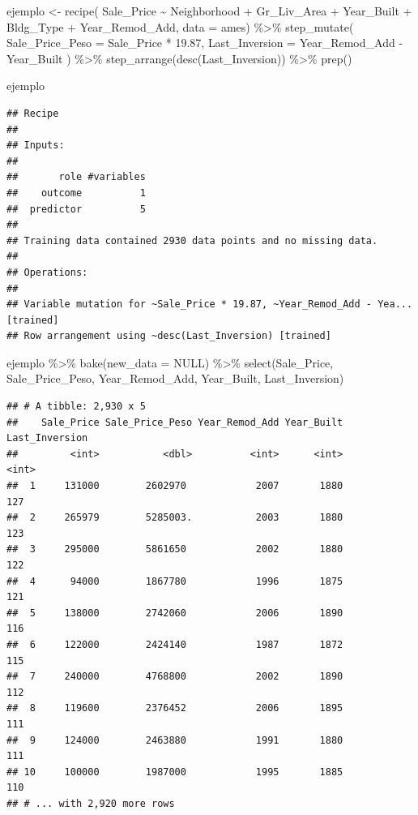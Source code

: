 \documentclass[
]{book}
\newenvironment{Shaded}{\begin{snugshade}}{\end{snugshade}}
\newcommand{\AttributeTok}[1]{\textcolor[rgb]{0.77,0.63,0.00}{#1}}
\newcommand{\ConstantTok}[1]{\textcolor[rgb]{0.00,0.00,0.00}{#1}}
\newcommand{\FloatTok}[1]{\textcolor[rgb]{0.00,0.00,0.81}{#1}}
\newcommand{\FunctionTok}[1]{\textcolor[rgb]{0.00,0.00,0.00}{#1}}
\newcommand{\NormalTok}[1]{#1}
\newcommand{\OtherTok}[1]{\textcolor[rgb]{0.56,0.35,0.01}{#1}}
\newcommand{\SpecialCharTok}[1]{\textcolor[rgb]{0.00,0.00,0.00}{#1}}
\begin{document}
\begin{Shaded}
\begin{Highlighting}[]
\NormalTok{ejemplo }\OtherTok{\textless{}{-}} \FunctionTok{recipe}\NormalTok{(}
\NormalTok{  Sale\_Price }\SpecialCharTok{\textasciitilde{}}\NormalTok{ Neighborhood }\SpecialCharTok{+}\NormalTok{ Gr\_Liv\_Area }\SpecialCharTok{+}\NormalTok{ Year\_Built }\SpecialCharTok{+}\NormalTok{ Bldg\_Type }\SpecialCharTok{+}\NormalTok{ Year\_Remod\_Add,}
  \AttributeTok{data =}\NormalTok{ ames) }\SpecialCharTok{\%\textgreater{}\%}
  \FunctionTok{step\_mutate}\NormalTok{(}
    \AttributeTok{Sale\_Price\_Peso =}\NormalTok{ Sale\_Price }\SpecialCharTok{*} \FloatTok{19.87}\NormalTok{,}
    \AttributeTok{Last\_Inversion =}\NormalTok{ Year\_Remod\_Add }\SpecialCharTok{{-}}\NormalTok{ Year\_Built}
\NormalTok{    ) }\SpecialCharTok{\%\textgreater{}\%} 
  \FunctionTok{step\_arrange}\NormalTok{(}\FunctionTok{desc}\NormalTok{(Last\_Inversion)) }\SpecialCharTok{\%\textgreater{}\%} 
  \FunctionTok{prep}\NormalTok{()}

\NormalTok{ejemplo}
\end{Highlighting}
\end{Shaded}

\begin{verbatim}
## Recipe
## 
## Inputs:
## 
##       role #variables
##    outcome          1
##  predictor          5
## 
## Training data contained 2930 data points and no missing data.
## 
## Operations:
## 
## Variable mutation for ~Sale_Price * 19.87, ~Year_Remod_Add - Yea... [trained]
## Row arrangement using ~desc(Last_Inversion) [trained]
\end{verbatim}

\begin{Shaded}
\begin{Highlighting}[]
\NormalTok{ejemplo }\SpecialCharTok{\%\textgreater{}\%} \FunctionTok{bake}\NormalTok{(}\AttributeTok{new\_data =} \ConstantTok{NULL}\NormalTok{) }\SpecialCharTok{\%\textgreater{}\%} 
  \FunctionTok{select}\NormalTok{(Sale\_Price, Sale\_Price\_Peso, Year\_Remod\_Add, Year\_Built, Last\_Inversion)}
\end{Highlighting}
\end{Shaded}

\begin{verbatim}
## # A tibble: 2,930 x 5
##    Sale_Price Sale_Price_Peso Year_Remod_Add Year_Built Last_Inversion
##         <int>           <dbl>          <int>      <int>          <int>
##  1     131000        2602970            2007       1880            127
##  2     265979        5285003.           2003       1880            123
##  3     295000        5861650            2002       1880            122
##  4      94000        1867780            1996       1875            121
##  5     138000        2742060            2006       1890            116
##  6     122000        2424140            1987       1872            115
##  7     240000        4768800            2002       1890            112
##  8     119600        2376452            2006       1895            111
##  9     124000        2463880            1991       1880            111
## 10     100000        1987000            1995       1885            110
## # ... with 2,920 more rows
\end{verbatim}
\end{document}
